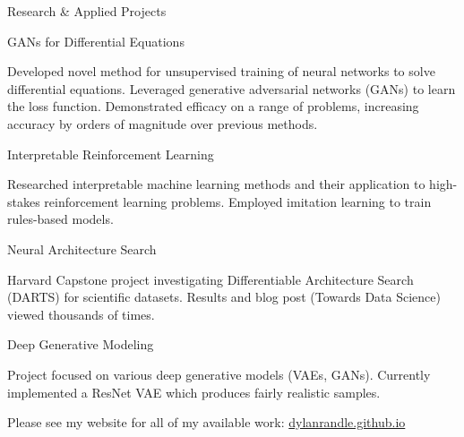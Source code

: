 \documentclass{resume} %
\begin{document}
\begin{rSection}{Research \& Applied Projects}

\begin{rSubsection}{GANs for Differential Equations}{}{}{}

\item Developed novel method for unsupervised training of neural networks to solve differential equations. Leveraged generative adversarial networks (GANs) to learn the loss function. Demonstrated efficacy on a range of problems, increasing accuracy by orders of magnitude over previous methods.

\end{rSubsection}

\begin{rSubsection}{Interpretable Reinforcement Learning}{}{}{}

\item Researched interpretable machine learning methods and their application to high-stakes reinforcement learning problems. Employed imitation learning to train rules-based models.

\end{rSubsection}

\begin{rSubsection}{Neural Architecture Search}{}{}{}
\item Harvard Capstone project investigating Differentiable Architecture Search (DARTS) for scientific datasets. Results and blog post (Towards Data Science) viewed thousands of times.
\end{rSubsection}

\begin{rSubsection}{Deep Generative Modeling}{}{}{}
\item Project focused on various deep generative models (VAEs, GANs). Currently implemented a ResNet VAE which produces fairly realistic samples.
\end{rSubsection}

Please see my website for all of my available work: \url{dylanrandle.github.io}

\end{rSection}

\end{document}
